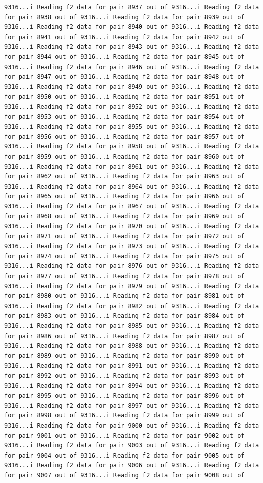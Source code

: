 \documentclass[
]{article}
\begin{document}
\begin{verbatim}
9316...i Reading f2 data for pair 8937 out of 9316...i Reading f2 data for pair 8938 out of 9316...i Reading f2 data for pair 8939 out of 9316...i Reading f2 data for pair 8940 out of 9316...i Reading f2 data for pair 8941 out of 9316...i Reading f2 data for pair 8942 out of 9316...i Reading f2 data for pair 8943 out of 9316...i Reading f2 data for pair 8944 out of 9316...i Reading f2 data for pair 8945 out of 9316...i Reading f2 data for pair 8946 out of 9316...i Reading f2 data for pair 8947 out of 9316...i Reading f2 data for pair 8948 out of 9316...i Reading f2 data for pair 8949 out of 9316...i Reading f2 data for pair 8950 out of 9316...i Reading f2 data for pair 8951 out of 9316...i Reading f2 data for pair 8952 out of 9316...i Reading f2 data for pair 8953 out of 9316...i Reading f2 data for pair 8954 out of 9316...i Reading f2 data for pair 8955 out of 9316...i Reading f2 data for pair 8956 out of 9316...i Reading f2 data for pair 8957 out of 9316...i Reading f2 data for pair 8958 out of 9316...i Reading f2 data for pair 8959 out of 9316...i Reading f2 data for pair 8960 out of 9316...i Reading f2 data for pair 8961 out of 9316...i Reading f2 data for pair 8962 out of 9316...i Reading f2 data for pair 8963 out of 9316...i Reading f2 data for pair 8964 out of 9316...i Reading f2 data for pair 8965 out of 9316...i Reading f2 data for pair 8966 out of 9316...i Reading f2 data for pair 8967 out of 9316...i Reading f2 data for pair 8968 out of 9316...i Reading f2 data for pair 8969 out of 9316...i Reading f2 data for pair 8970 out of 9316...i Reading f2 data for pair 8971 out of 9316...i Reading f2 data for pair 8972 out of 9316...i Reading f2 data for pair 8973 out of 9316...i Reading f2 data for pair 8974 out of 9316...i Reading f2 data for pair 8975 out of 9316...i Reading f2 data for pair 8976 out of 9316...i Reading f2 data for pair 8977 out of 9316...i Reading f2 data for pair 8978 out of 9316...i Reading f2 data for pair 8979 out of 9316...i Reading f2 data for pair 8980 out of 9316...i Reading f2 data for pair 8981 out of 9316...i Reading f2 data for pair 8982 out of 9316...i Reading f2 data for pair 8983 out of 9316...i Reading f2 data for pair 8984 out of 9316...i Reading f2 data for pair 8985 out of 9316...i Reading f2 data for pair 8986 out of 9316...i Reading f2 data for pair 8987 out of 9316...i Reading f2 data for pair 8988 out of 9316...i Reading f2 data for pair 8989 out of 9316...i Reading f2 data for pair 8990 out of 9316...i Reading f2 data for pair 8991 out of 9316...i Reading f2 data for pair 8992 out of 9316...i Reading f2 data for pair 8993 out of 9316...i Reading f2 data for pair 8994 out of 9316...i Reading f2 data for pair 8995 out of 9316...i Reading f2 data for pair 8996 out of 9316...i Reading f2 data for pair 8997 out of 9316...i Reading f2 data for pair 8998 out of 9316...i Reading f2 data for pair 8999 out of 9316...i Reading f2 data for pair 9000 out of 9316...i Reading f2 data for pair 9001 out of 9316...i Reading f2 data for pair 9002 out of 9316...i Reading f2 data for pair 9003 out of 9316...i Reading f2 data for pair 9004 out of 9316...i Reading f2 data for pair 9005 out of 9316...i Reading f2 data for pair 9006 out of 9316...i Reading f2 data for pair 9007 out of 9316...i Reading f2 data for pair 9008 out of 
\end{verbatim}
\end{document}
